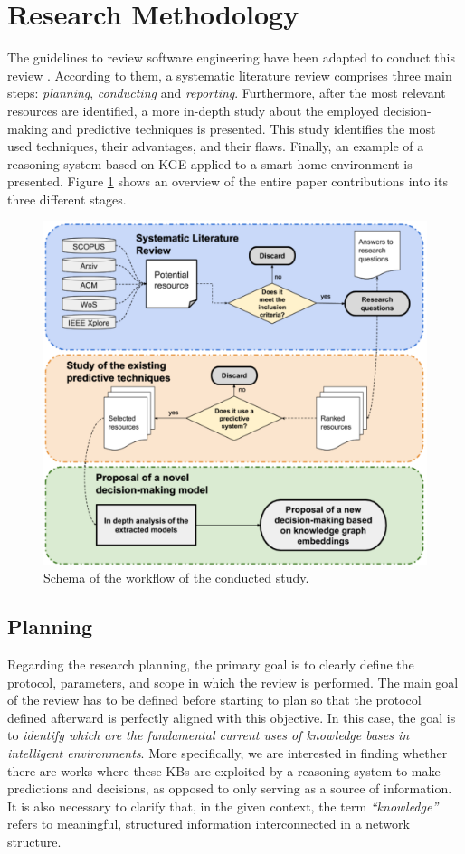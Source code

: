\section{Research Methodology} \label{sec:method}

The guidelines to review software engineering have been adapted to conduct this review \citep{Kitchenham07guidelinesfor}. According to them, a systematic literature review comprises three main steps: \textit{planning}, \textit{conducting} and \textit{reporting}. Furthermore, after the most relevant resources are identified, a more in-depth study about the employed decision-making and predictive techniques is presented. This study identifies the most used techniques, their advantages, and their flaws. Finally, an example of a reasoning system based on KGE applied to a smart home environment is presented. Figure \ref{fig:workflow} shows an overview of the entire paper contributions into its three different stages.

\begin{figure}[H]
\centering
\includegraphics[width=12cm]{2_stateoftheart/figures/sys_methodology.pdf}
\caption{Schema of the workflow of the conducted study. \label{fig:workflow}}
\end{figure}   

\subsection{Planning}
Regarding the research planning, the primary goal is to clearly define the protocol, parameters, and scope in which the review is performed. The main goal of the review has to be defined before starting to plan so that the protocol defined afterward is perfectly aligned with this objective. In this case, the goal is to \textit{identify which are the fundamental current uses of knowledge bases in intelligent environments}. More specifically, we are interested in finding whether there are works where these KBs are exploited by a reasoning system to make predictions and decisions, as opposed to only serving as a source of information. It is also necessary to clarify that, in the given context, the term \textit{``knowledge''} refers to meaningful, structured information interconnected in a network structure.

